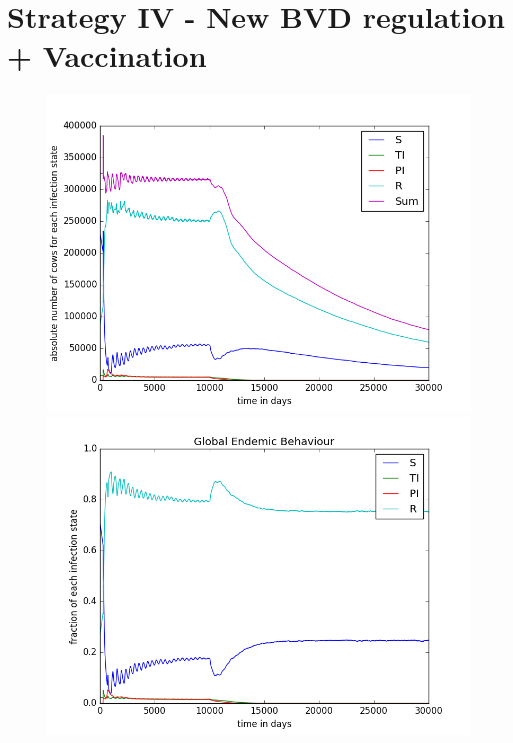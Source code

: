 \section{Strategy IV - New BVD regulation + Vaccination}


\begin{figure}[htbp]
\begin{minipage}{0.5\textwidth}
\centering
\noindent\includegraphics[width=0.95\linewidth,height=\textheight,
keepaspectratio]{cont4totalEndemicNumbers.png} 
\end{minipage}
\begin{minipage}{0.5\textwidth}
\centering
\noindent\includegraphics[width=0.95\linewidth,height=\textheight,
keepaspectratio]{cont4endemicFractions.png} 
\end{minipage}
\caption[Endemic Behavior in Containment Strategy One]{}
\label{fig:demographyScen8}
\end{figure}



